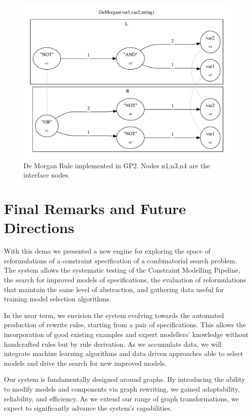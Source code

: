 \documentclass[runningheads]{llncs}
\begin{document}
\vspace{-18pt}

\begin{figure}[ht]
\centering
%  
  \includegraphics[width=0.70\columnwidth]{demorgan.pdf}
  \caption{De Morgan Rule implemented in GP2. Nodes n1,n3,n4 are the interface nodes.}
  \label{fig:demorgan}
\end{figure}
\vspace{-8pt}
\section{Final Remarks and Future Directions}

With this demo we presented a new engine for exploring the space of reformulations of a constraint specification of a combinatorial search problem. The system allows the systematic testing of the Constraint Modelling Pipeline, the search for improved models of \essence specifications, the evaluation of reformulations that maintain the same level of abstraction, and gathering data useful for training model selection algorithms.

In the near term, we envision the system evolving towards the automated production of rewrite rules, starting from a pair of specifications. This allows the incorporation of good existing examples and expert modellers' knowledge without handcrafted rules but by rule derivation.
As we accumulate data, we will integrate machine learning algorithms and data driven approaches able to select models and drive the search for new improved models.

Our system is fundamentally designed around graphs. By introducing the ability to modify models and components via graph rewriting, we gained adaptability, reliability, and efficiency. As we extend our range of graph transformations, we expect to significantly advance the system's capabilities.
\end{document}
